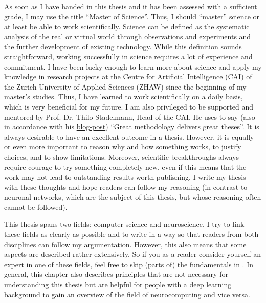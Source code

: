 \small
As soon as I have handed in this thesis and it has been assessed with a sufficient grade, I may use the title ``Master of Science''.
Thus, I should ``master'' science or at least be able to work scientifically.
Science can be defined as the systematic analysis of the real or virtual world through observations and experiments and the further development of existing technology.
While this definition sounds straightforward, working successfully in science requires a lot of experience and commitment.
I have been lucky enough to learn more about science and apply my knowledge in research projects at the Centre for Artificial Intelligence (CAI) of the Zurich University of Applied Sciences (ZHAW) since the beginning of my master's studies.
Thus, I have learned to work scientifically on a daily basis, which is very beneficial for my future.
I am also privileged to be supported and mentored by Prof. Dr. Thilo Stadelmann, Head of the CAI.
He uses to say (also in accordance with his \href{https://stdm.github.io/Great-methodology-delivers-great-theses/}{blog-post}) ``Great methodology delivers great theses''.
It is always desirable to have an excellent outcome in a thesis.
However, it is equally or even more important to reason why and how something works, to justify choices, and to show limitations.
Moreover, scientific breakthroughs always require courage to try something completely new, even if this means that the work may not lead to outstanding results worth publishing.
I write my thesis with these thoughts and hope readers can follow my reasoning (in contrast to neuronal networks, which are the subject of this thesis, but whose reasoning often cannot be followed).

This thesis spans two fields; computer science and neuroscience.
I try to link these fields as clearly as possible and to write in a way so that readers from both disciplines can follow my argumentation.
However, this also means that some aspects are described rather extensively.
So if you as a reader consider yourself an expert in one of these fields, feel free to skip (parts of) the fundamentals in .
In general, this chapter also describes principles that are not necessary for understanding this thesis but are helpful for people with a deep learning background to gain an overview of the field of neurocomputing and vice versa.

